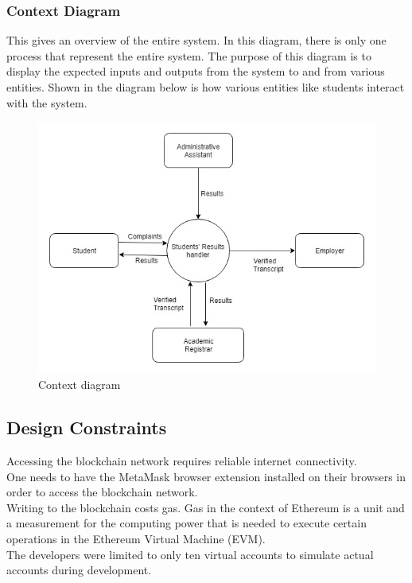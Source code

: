 \newpage
\subsubsection{Context Diagram}
This gives an overview of the entire system. In this diagram, there is only one process that represent the entire system. The purpose of this diagram is to display the expected inputs and outputs from the system to and from various entities. Shown in the diagram below is how various entities like students interact with the system.

\begin{figure}[!h]
\includegraphics[scale=0.7]{images/context.jpg}
\caption{Context diagram}
\end{figure}

\subsection{Design Constraints}
Accessing the blockchain network requires reliable internet connectivity.\\

One needs to have the MetaMask browser extension installed on their browsers in order to access the blockchain network.\\

Writing to the blockchain costs gas. Gas in the context of Ethereum is a unit and a measurement for the computing power that is needed to execute certain operations in the Ethereum Virtual Machine (EVM).\\

The developers were limited to only ten virtual accounts to simulate actual accounts during development.\\


